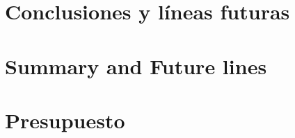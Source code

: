 \documentclass[spanish,a4paper,12pt,oneside]{extreport}
\begin{document}


\newpage{\pagestyle{empty}}
\thispagestyle{empty}

\chapter{Conclusiones y líneas futuras}
\label{chapter:Conclusiones}



\newpage{\pagestyle{empty}}
\thispagestyle{empty}

\chapter{Summary and Future lines}
\label{chapter:ingles}



\newpage{\pagestyle{empty}}
\thispagestyle{empty}

\chapter{Presupuesto}
\label{chapter:Presupuesto}







\nocite{*}

\end{document}
